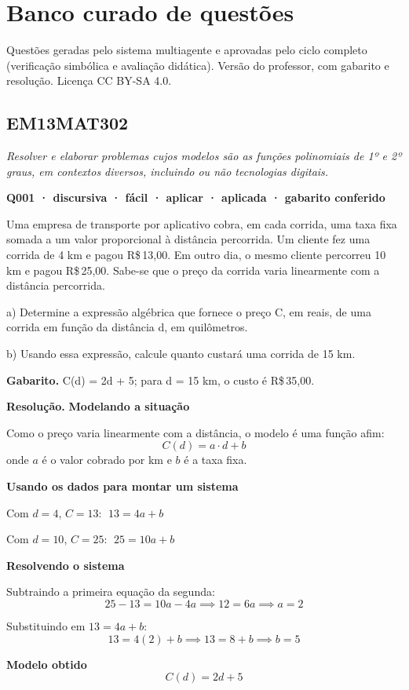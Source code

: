 \documentclass[11pt,a4paper]{article}
\begin{document}
\section*{Banco curado de questões}
Questões geradas pelo sistema multiagente e aprovadas pelo ciclo completo (verificação simbólica e avaliação didática). Versão do professor, com gabarito e resolução. Licença CC BY-SA 4.0.
\subsection*{EM13MAT302}
{\small\itshape Resolver e elaborar problemas cujos modelos são as funções polinomiais de 1º e 2º graus, em contextos diversos, incluindo ou não tecnologias digitais.}

\bigskip\noindent\textbf{Q001 · discursiva · fácil · aplicar · aplicada · gabarito conferido}\par\nopagebreak
Uma empresa de transporte por aplicativo cobra, em cada corrida, uma taxa fixa somada a um valor proporcional à distância percorrida. Um cliente fez uma corrida de 4 km e pagou R\$\,13,00. Em outro dia, o mesmo cliente percorreu 10 km e pagou R\$\,25,00. Sabe-se que o preço da corrida varia linearmente com a distância percorrida.

a) Determine a expressão algébrica que fornece o preço C, em reais, de uma corrida em função da distância d, em quilômetros.

b) Usando essa expressão, calcule quanto custará uma corrida de 15 km.

\textbf{Gabarito.} C(d) = 2d + 5; para d = 15 km, o custo é R\$\,35,00.

\textbf{Resolução.} \textbf{Modelando a situação}

Como o preço varia linearmente com a distância, o modelo é uma função afim:
$$C(d) = a \cdot d + b$$
onde $a$ é o valor cobrado por km e $b$ é a taxa fixa.

\textbf{Usando os dados para montar um sistema}

Com $d=4$, $C=13$: $\;13 = 4a + b$

Com $d=10$, $C=25$: $\;25 = 10a + b$

\textbf{Resolvendo o sistema}

Subtraindo a primeira equação da segunda:
$$25 - 13 = 10a - 4a \implies 12 = 6a \implies a = 2$$

Substituindo em $13 = 4a+b$:
$$13 = 4(2) + b \implies 13 = 8 + b \implies b = 5$$

\textbf{Modelo obtido}
$$C(d) = 2d + 5$$
\end{document}
